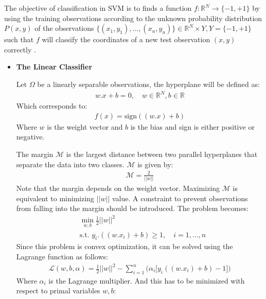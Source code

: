 The objective of classification in SVM is to finds a function $f:\mathbb{R}^{N} \rightarrow \lbrace -1,+1 \rbrace$ by using the training observations according to the unknown probability distribution $P(x,y)$ of the observations $\lbrace (x_1,y_1),\ldots,(x_n,y_n) \rbrace \in \mathbb{R}^{N} \times Y, Y=\lbrace -1,+1 \rbrace$ such that $f$ will classify the coordinates of a new test observation $(x,y)$ correctly \citep{Maimon}.
\begin{itemize}
\item \textbf{The Linear Classifier}

Let $\Omega$ be a linearly separable observations, the hyperplane will be defined as:
\begin{align}
\label{equ-3-1}
w.x+b=0, \quad w \in \mathbb{R}^N , b \in \mathbb{R}
\end{align}
Which corresponds to:
\begin{align}
\label{equ-3-2}
f(x) = \text{sign}((w.x)+b)
\end{align}
Where $w$ is the weight vector and $b$ is the bias and sign is either positive or negative. 

The margin $\mathcal{M}$ is the largest distance between two parallel hyperplanes that separate the data into two classes. $\mathcal{M}$ is given by:
\begin{align}
\label{equ-3-3}
\mathcal{M} = \frac{2}{||w||}
\end{align}
Note that the margin depends on the weight vector. Maximizing $\mathcal{M}$ is equivalent to minimizing $||w||$ value. A constraint to prevent observations from falling into the margin should be introduced. The problem becomes:
\begin{align}
\label{equ-3-4}
&\min_{w,b}{\frac{1}{2}||w||^2}\\
&\text{s.t. } y_i . ((w.x_i)+b) \geq 1, \quad i=1,\ldots,n
\end{align}
Since this problem is convex optimization, it can be solved using the Lagrange function \citep{Maimon} as follows:
\begin{align}
\label{equ-3-5}
\mathcal{L}(w,b,\alpha) = \frac{1}{2} ||w||^2 - \sum_{i=1}^{n}\bigg( \alpha_i\big[ y_i((w.x_i)+b)-1 \big] \bigg) 
\end{align}
Where $\alpha_i$ is the Lagrange multiplier. And this has to be minimized with respect to primal variables $w,b$:


\end{itemize}
